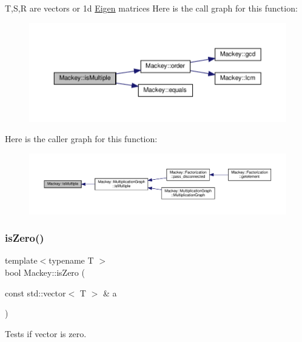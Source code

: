 T,S,R are vectors or 1d \hyperlink{namespaceEigen}{Eigen} matrices Here is the call graph for this function\+:\nopagebreak
\begin{figure}[H]
\begin{center}
\leavevmode
\includegraphics[width=350pt]{namespaceMackey_aef81f82c080c97bb31154524af52b62c_cgraph}
\end{center}
\end{figure}
Here is the caller graph for this function\+:\nopagebreak
\begin{figure}[H]
\begin{center}
\leavevmode
\includegraphics[width=350pt]{namespaceMackey_aef81f82c080c97bb31154524af52b62c_icgraph}
\end{center}
\end{figure}
\mbox{\label{namespaceMackey_a4c3647777bc890a4649ae24b138bbb79}} 
\subsubsection{\texorpdfstring{is\+Zero()}{isZero()}}
{\footnotesize\ttfamily template$<$typename T $>$ \\
bool Mackey\+::is\+Zero (\begin{DoxyParamCaption}\item[{const std\+::vector$<$ T $>$ \&}]{a }\end{DoxyParamCaption})}



Tests if vector is zero. 

